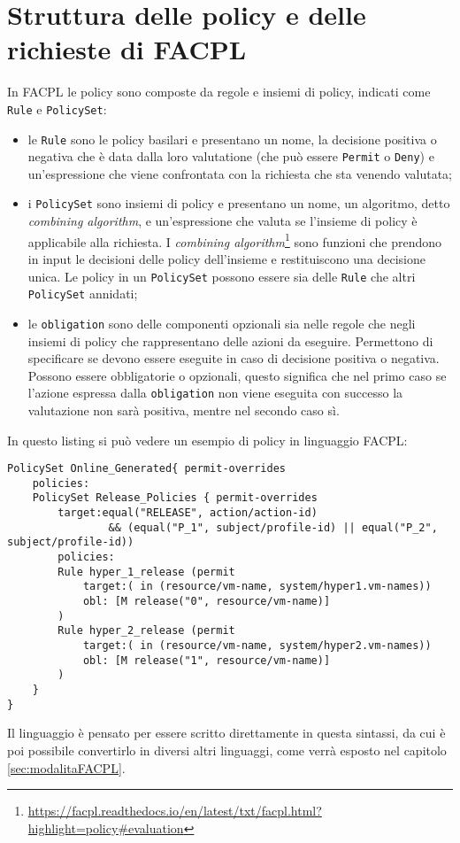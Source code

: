 \section{Struttura delle policy e delle richieste di FACPL}
In FACPL le policy sono composte da regole e insiemi di policy, indicati come \texttt{Rule} e \texttt{PolicySet}:
\begin{itemize}
    \item le \texttt{Rule} sono le policy basilari e presentano un nome, la decisione positiva o negativa che è data dalla loro valutatione (che può essere \texttt{Permit} o \texttt{Deny}) e un'espressione che viene confrontata con la richiesta che sta venendo valutata;
    \item i \texttt{PolicySet} sono insiemi di policy e presentano un nome, un algoritmo, detto \emph{combining algorithm}, e un'espressione che valuta se l'insieme di policy è applicabile alla richiesta. I \emph{combining algorithm}\footnote{\url{https://facpl.readthedocs.io/en/latest/txt/facpl.html?highlight=policy\#evaluation}} sono funzioni che prendono in input le decisioni delle policy dell'insieme e restituiscono una decisione unica. Le policy in un \texttt{PolicySet} possono essere sia delle \texttt{Rule} che altri \texttt{PolicySet} annidati;
    \item le \texttt{obligation} sono delle componenti opzionali sia nelle regole che negli insiemi di policy che rappresentano delle azioni da eseguire. Permettono di specificare se devono essere eseguite in caso di decisione positiva o negativa. Possono essere obbligatorie o opzionali, questo significa che nel primo caso se l'azione espressa dalla \texttt{obligation} non viene eseguita con successo la valutazione non sarà positiva, mentre nel secondo caso sì.
\end{itemize}
In questo listing si può vedere un esempio di policy in linguaggio FACPL:
\begin{lstlisting}[label={code:policyFACPL}, caption={Esempio di policy in FACPL}, language=FACPL, basicstyle=\fontsize{9.5}{10}\ttfamily]
PolicySet Online_Generated{ permit-overrides
	policies:
	PolicySet Release_Policies { permit-overrides
  		target:equal("RELEASE", action/action-id)
    			&& (equal("P_1", subject/profile-id) || equal("P_2", subject/profile-id))
  		policies:
    	Rule hyper_1_release (permit
      		target:( in (resource/vm-name, system/hyper1.vm-names))
      		obl: [M release("0", resource/vm-name)]
    	)
    	Rule hyper_2_release (permit
      		target:( in (resource/vm-name, system/hyper2.vm-names))
      		obl: [M release("1", resource/vm-name)]
    	)
  	}
}
\end{lstlisting}
Il linguaggio è pensato per essere scritto direttamente in questa sintassi, da cui è poi possibile convertirlo in diversi altri linguaggi, come verrà esposto nel capitolo \ref{sec:modalitaFACPL}.\par

